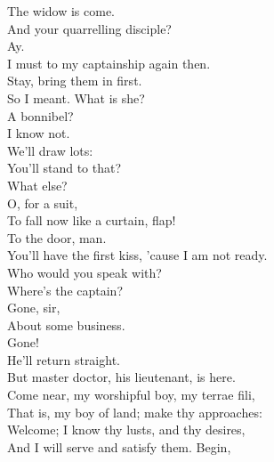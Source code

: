 \documentclass[a4paper,oneside,12pt]{memoir}
\begin{document}
\begin{drama*}
\scene

\subtlespeaks The widow is come.\\
\facespeaks {} And your quarrelling disciple?\\
\subtlespeaks Ay.\\
\facespeaks {} I must to my captainship again then.\\
\subtlespeaks Stay, bring them in first.\\
\facespeaks {} So I meant. What is she?\\
A bonnibel?\\
\subtlespeaks {} I know not.\\
\facespeaks {} We'll draw lots:\\
You'll stand to that?\\
\subtlespeaks {} What else?\\
\facespeaks {} O, for a suit,\\
To fall now like a curtain, flap!\\
\subtlespeaks {} To the door, man.\\
\facespeaks You'll have the first kiss, 'cause I am not ready.\\
Who would you speak with?\\
\kastrilspeaks {} Where's the captain?\\
\facespeaks {} Gone, sir,\\
About some business.\\
\kastrilspeaks {} Gone!\\
\facespeaks {} He'll return straight.\\
But master doctor, his lieutenant, is here.\\
\subtlespeaks Come near, my worshipful boy, my terrae fili,\\
That is, my boy of land; make thy approaches:\\
Welcome; I know thy lusts, and thy desires,\\
And I will serve and satisfy them. Begin,\\

\end{drama*}
\end{document}
